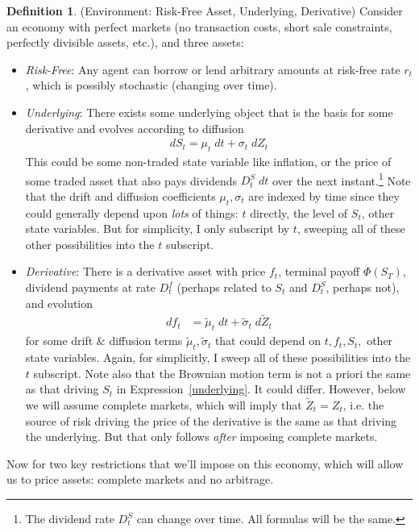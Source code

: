 \documentclass[12pt]{article}
\theoremstyle{plain}
\theoremstyle{definition}
\newtheorem{defn}[thm]{Definition}
\theoremstyle{remark}
\begin{document}
\begin{defn}(Environment: Risk-Free Asset, Underlying, Derivative)
Consider an economy with perfect markets (no transaction costs, short
sale constraints, perfectly divisible assets, etc.), and three assets:
\begin{itemize}
  \item \emph{Risk-Free}:
    Any agent can borrow or lend arbitrary amounts at risk-free rate
    $r_t$, which is possibly stochastic (changing over time).

  \item \emph{Underlying}:
    There exists some underlying object that is the basis for some
    derivative and evolves according to diffusion
    \begin{align}
      dS_t = \mu_t\;dt + \sigma_t\;dZ_t
      \label{underlying}
    \end{align}
    This could be some non-traded state variable like inflation,
    or the price of some traded asset that also pays dividends
    $D_t^S\;dt$ over the next instant.\footnote{%
      The dividend rate $D_t^S$ can change over time.
      All formulas will be the same.
    }
    Note that the drift and diffusion coefficients $\mu_t,\sigma_t$
    are indexed by time since they could generally depend upon
    \emph{lots} of things: $t$ directly, the level of $S_t$, other state
    variables. But for simplicity, I only subscript by $t$, sweeping all
    of these other possibilities into the $t$ subscript.

  \item \emph{Derivative}:
    There is a derivative asset with price $f_t$, terminal payoff
    $\Phi(S_T)$, dividend payments at rate $D_t^f$ (perhaps related to
    $S_t$ and $D_t^S$, perhaps not), and evolution
    \begin{align}
      df_{t}
      &=
      \tilde{\mu}_t
      \; dt
      +
      \tilde{\sigma}_t
      \;d\tilde{Z}_t
      \label{dfi}
    \end{align}
    for some drift \& diffusion terms $\tilde{\mu}_t,\tilde{\sigma}_t$
    that could depend on $t,f_t,S_t,$ other state variables.
    Again, for simplicitly, I sweep all of these possibilities into the
    $t$ subscript.
    Note also that the Brownian motion term is not a priori the same as
    that driving $S_t$ in Expression~\ref{underlying}.
    It could differ. However, below we will assume complete markets,
    which will imply that $\tilde{Z}_t=Z_t$, i.e. the source of risk
    driving the price of the derivative is the same as that driving the
    underlying. But that only follows \emph{after} imposing complete
    markets.

\end{itemize}
Now for two key restrictions that we'll impose on this economy, which
will allow us to price assets: complete markets and no arbitrage.
\end{defn}
\end{document}

